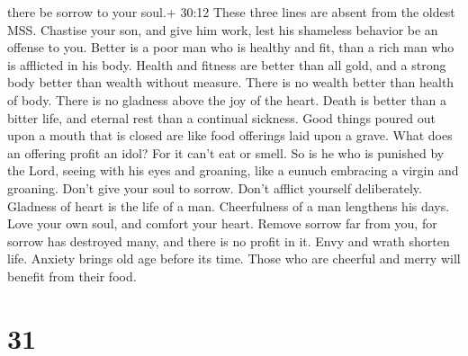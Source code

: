 there be sorrow to your soul.+ 30:12 These three lines are absent from
the oldest MSS.  Chastise your son, and give him work, lest
his shameless behavior be an offense to you.  Better is a
poor man who is healthy and fit, than a rich man who is afflicted in his
body.  Health and fitness are better than all gold, and a
strong body better than wealth without measure.  There is
no wealth better than health of body. There is no gladness above the joy
of the heart.  Death is better than a bitter life, and
eternal rest than a continual sickness.  Good things poured
out upon a mouth that is closed are like food offerings laid upon a
grave.  What does an offering profit an idol? For it can't
eat or smell. So is he who is punished by the Lord,  seeing
with his eyes and groaning, like a eunuch embracing a virgin and
groaning.  Don't give your soul to sorrow. Don't afflict
yourself deliberately.  Gladness of heart is the life of a
man. Cheerfulness of a man lengthens his days.  Love your
own soul, and comfort your heart. Remove sorrow far from you, for sorrow
has destroyed many, and there is no profit in it.  Envy and
wrath shorten life. Anxiety brings old age before its time.
 Those who are cheerful and merry will benefit from their
food.

\hypertarget{section-9}{%
\section{31}\label{section-9}}

